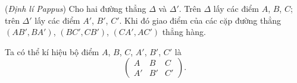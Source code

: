         \begin{theorem}
            (\textit{Định lí Pappus}) Cho hai đường thẳng \(\Delta\) và \(\Delta'\). Trên \(\Delta\) lấy các điểm \(A\), \(B\), \(C\); trên \(\Delta'\) lấy các điểm \(A'\), \(B'\), \(C'\). Khi đó giao điểm của các cặp đường thẳng \((AB',BA')\), \((BC',CB')\), \((CA',AC')\) thẳng hàng.
        \end{theorem}

        \begin{notice}
            Ta có thể kí hiệu bộ điểm \(A\), \(B\), \(C\), \(A'\), \(B'\), \(C'\) là
            \[\begin{pmatrix}
                A & B & C \\
                A' & B' & C'
            \end{pmatrix}.\]
        \end{notice}

